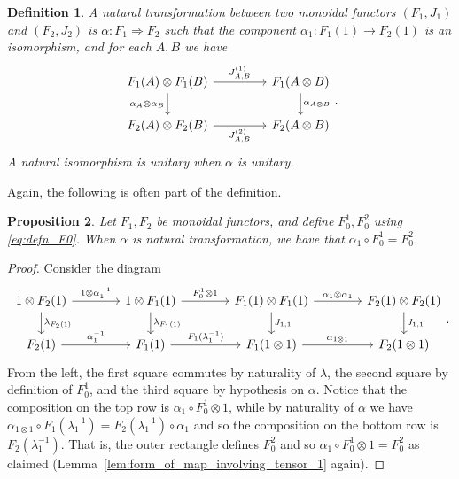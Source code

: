 \documentclass[a4paper,11pt]{article}
\theoremstyle{plain}
\newtheorem{proposition}{Proposition}[section]
\newtheorem{definition}[proposition]{Definition}
\theoremstyle{remark}
\begin{document}
\begin{definition}\label{defn:nt_monoidal}
A \emph{natural transformation} between two monoidal functors $(F_1, J_1)$ and $(F_2, J_2)$ is $\alpha \colon F_1 \Rightarrow F_2$ such that the component $\alpha_1 \colon F_1(1)\to F_2(1)$ is an isomorphism, and for each $A,B$ we have
\[ \begin{tikzcd}[column sep=10ex]
  F_1(A)\otimes F_1(B) \ar[d, "\alpha_A\otimes\alpha_B"'] \ar[r, "J^{(1)}_{A,B}"]  & F_1(A\otimes B) \ar[d, "\alpha_{A\otimes B}"]  \\
  F_2(A)\otimes F_2(B)  \ar[r, "J^{(2)}_{A,B}"']  & F_2(A\otimes B)
\end{tikzcd}. \]
A natural isomorphism is \emph{unitary} when $\alpha$ is unitary.
\end{definition}

Again, the following is often part of the definition.

\begin{proposition}
Let $F_1, F_2$ be monoidal functors, and define $F_0^1, F_0^2$ using \eqref{eq:defn_F0}.  When $\alpha$ is natural transformation, we have that $\alpha_1 \circ F_0^1 = F_0^2$.
\end{proposition}
\begin{proof}
Consider the diagram
\[\begin{tikzcd}[column sep=9ex]
1\otimes F_2(1) \ar[r, "1\otimes\alpha_1^{-1}"] \ar[d, "\lambda_{F_2(1)}"]
   & 1\otimes F_1(1) \ar[r, "F_0^1\otimes 1"] \ar[d, "\lambda_{F_1(1)}"]
   & F_1(1)\otimes F_1(1) \ar[r, "\alpha_1\otimes\alpha_1"] \ar[d, "J_{1,1}"]
   & F_2(1)\otimes F_2(1) \ar[d, "J_{1,1}"]  \\
F_2(1) \ar[r, "\alpha_1^{-1}"]
   & F_1(1) \ar[r, "F_1(\lambda_1^{-1})"]
   & F_1(1\otimes 1) \ar[r, "\alpha_{1\otimes 1}"]
   & F_2(1\otimes 1)
\end{tikzcd}.\]
From the left, the first square commutes by naturality of $\lambda$, the second square by definition of $F_0^1$, and the third square by hypothesis on $\alpha$.  Notice that the composition on the top row is $\alpha_1\circ F_0^1\otimes 1$, while by naturality of $\alpha$ we have $\alpha_{1\otimes 1}\circ F_1(\lambda_1^{-1}) = F_2(\lambda_1^{-1}) \circ \alpha_1$ and so the composition on the bottom row is $F_2(\lambda_1^{-1})$.  That is, the outer rectangle defines $F_0^2$ and so $\alpha_1\circ F_0^1\otimes 1 = F_0^2$ as claimed (Lemma~\ref{lem:form_of_map_involving_tensor_1} again).
\end{proof}
\end{document}
